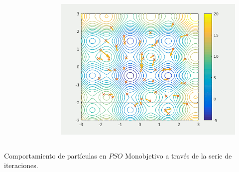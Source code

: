 \documentclass[usenames,dvipsnames]{beamer}
\begin{document}
\begin{frame}
\begin{columns}[t]
\begin{column}{.45\textwidth}
\begin{figure}[H]
\end{figure}
\end{column}
\begin{column}{.45\textwidth}
    \begin{figure}[H]
        \centering
        \includegraphics[width=\textwidth]{./graphics/ejemplopso/capas-8.png}   
    \end{figure}
\end{column}
\end{columns}
Comportamiento de partículas en $PSO$ Monobjetivo a través de la serie de iteraciones.

\end{frame}
\end{document}
